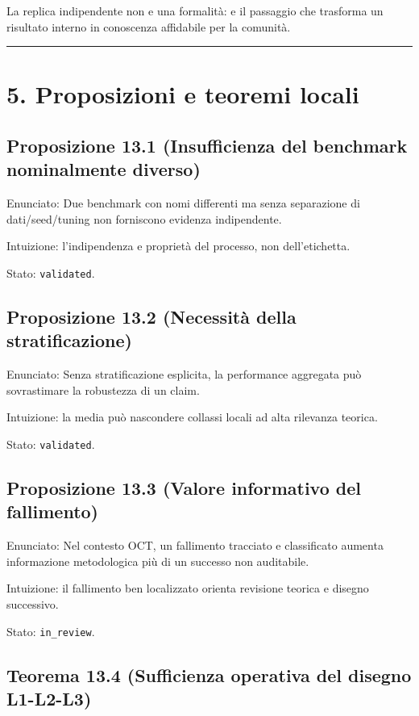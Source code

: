 La replica indipendente non e una formalità: e il passaggio che trasforma un risultato interno in conoscenza affidabile per la comunità.

\begin{center}\rule{0.5\linewidth}{0.5pt}\end{center}

\section{5. Proposizioni e teoremi locali}

\subsection{Proposizione 13.1 (Insufficienza del benchmark nominalmente diverso)}

Enunciato:
Due benchmark con nomi differenti ma senza separazione di dati/seed/tuning non forniscono evidenza indipendente.

Intuizione:
l'indipendenza e proprietà del processo, non dell'etichetta.

Stato: \texttt{validated}.

\subsection{Proposizione 13.2 (Necessità della stratificazione)}

Enunciato:
Senza stratificazione esplicita, la performance aggregata può sovrastimare la robustezza di un claim.

Intuizione:
la media può nascondere collassi locali ad alta rilevanza teorica.

Stato: \texttt{validated}.

\subsection{Proposizione 13.3 (Valore informativo del fallimento)}

Enunciato:
Nel contesto OCT, un fallimento tracciato e classificato aumenta informazione metodologica più di un successo non auditabile.

Intuizione:
il fallimento ben localizzato orienta revisione teorica e disegno successivo.

Stato: \texttt{in\_review}.

\subsection{Teorema 13.4 (Sufficienza operativa del disegno L1-L2-L3)}

